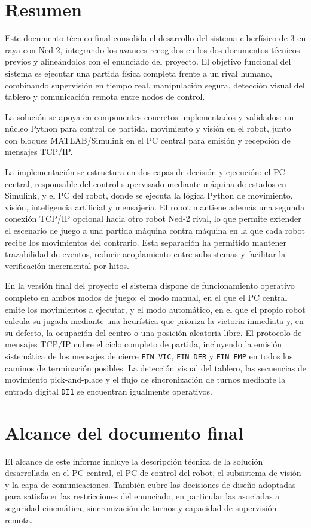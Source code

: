 \documentclass[12pt,a4paper]{article}
\begin{document}
\section{Resumen}
Este documento t\'ecnico final consolida el desarrollo del sistema ciberf\'isico de 3 en raya con Ned-2, integrando los avances recogidos en los dos documentos t\'ecnicos previos y aline\'andolos con el enunciado del proyecto. El objetivo funcional del sistema es ejecutar una partida f\'isica completa frente a un rival humano, combinando supervisi\'on en tiempo real, manipulaci\'on segura, detecci\'on visual del tablero y comunicaci\'on remota entre nodos de control.

La soluci\'on se apoya en componentes concretos implementados y validados: un n\'ucleo Python para control de partida, movimiento y visi\'on en el robot, junto con bloques MATLAB/Simulink en el PC central para emisi\'on y recepci\'on de mensajes TCP/IP.
\par
La implementaci\'on se estructura en dos capas de decisi\'on y ejecuci\'on: el PC central, responsable del control supervisado mediante m\'aquina de estados en Simulink, y el PC del robot, donde se ejecuta la l\'ogica Python de movimiento, visi\'on, inteligencia artificial y mensajer\'ia. El robot mantiene adem\'as una segunda conexi\'on TCP/IP opcional hacia otro robot Ned-2 rival, lo que permite extender el escenario de juego a una partida m\'aquina contra m\'aquina en la que cada robot recibe los movimientos del contrario. Esta separaci\'on ha permitido mantener trazabilidad de eventos, reducir acoplamiento entre subsistemas y facilitar la verificaci\'on incremental por hitos.
\par
En la versi\'on final del proyecto el sistema dispone de funcionamiento operativo completo en ambos modos de juego: el modo manual, en el que el PC central emite los movimientos a ejecutar, y el modo autom\'atico, en el que el propio robot calcula su jugada mediante una heur\'istica que prioriza la victoria inmediata y, en su defecto, la ocupaci\'on del centro o una posici\'on aleatoria libre. El protocolo de mensajes TCP/IP cubre el ciclo completo de partida, incluyendo la emisi\'on sistem\'atica de los mensajes de cierre \texttt{FIN VIC}, \texttt{FIN DER} y \texttt{FIN EMP} en todos los caminos de terminaci\'on posibles. La detecci\'on visual del tablero, las secuencias de movimiento pick-and-place y el flujo de sincronizaci\'on de turnos mediante la entrada digital \texttt{DI1} se encuentran igualmente operativos.

\section{Alcance del documento final}
El alcance de este informe incluye la descripci\'on t\'ecnica de la soluci\'on desarrollada en el PC central, el PC de control del robot, el subsistema de visi\'on y la capa de comunicaciones. Tambi\'en cubre las decisiones de dise\~no adoptadas para satisfacer las restricciones del enunciado, en particular las asociadas a seguridad cinem\'atica, sincronizaci\'on de turnos y capacidad de supervisi\'on remota.
\end{document}
